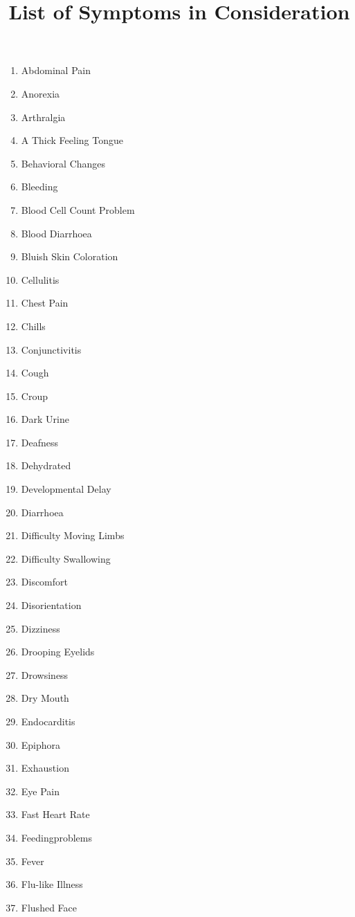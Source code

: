 \documentclass{article}
\title{List of Symptoms in Consideration}
\date{}
\begin{document}
\maketitle
\begin{multicols}{2}
  \begin{enumerate}
    \item Abdominal Pain
    \item Anorexia
    \item Arthralgia
    \item A Thick Feeling Tongue
    \item Behavioral Changes
    \item Bleeding
    \item Blood Cell Count Problem
    \item Blood Diarrhoea
    \item Bluish Skin Coloration
    \item Cellulitis
    \item Chest Pain
    \item Chills
    \item Conjunctivitis
    \item Cough
    \item Croup
    \item Dark Urine
    \item Deafness
    \item Dehydrated
    \item Developmental Delay
    \item Diarrhoea
    \item Difficulty Moving Limbs
    \item Difficulty Swallowing
    \item Discomfort
    \item Disorientation
    \item Dizziness
    \item Drooping Eyelids
    \item Drowsiness
    \item Dry Mouth
    \item Endocarditis
    \item Epiphora
    \item Exhaustion
    \item Eye Pain
    \item Fast Heart Rate
    \item Feedingproblems
    \item Fever
    \item Flu-like Illness
    \item Flushed Face

\end{enumerate}
\end{multicols}
\end{document}
